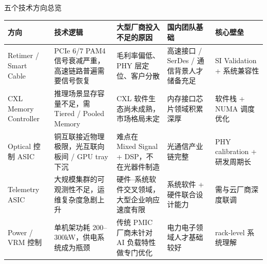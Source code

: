\documentclass[aspectratio=169, 8pt, UTF8]{ctexbeamer}
\begin{document}
\begin{frame}{五个技术方向总览}
  \centering
  \footnotesize
  \begin{tabularx}{\textwidth}{p{2.2cm} p{2.9cm} p{2.4cm} p{2.6cm} p{2.8cm}}
    \toprule
    \textbf{方向} & \textbf{技术逻辑} & \textbf{大型厂商投入不足的原因} & \textbf{国内团队基础} & \textbf{核心壁垒} \\
    \midrule
    Retimer / Smart Cable
      & PCIe 6/7 PAM4 信号衰减严重，高速链路普遍需要信号恢复
      & 毛利率偏低、PHY 层定位、客户分散
      & 高速接口 / SerDes / 通信背景人才储备充足
      & SI Validation + 系统兼容性 \\
    \addlinespace
    CXL Memory Controller
      & 推理场景显存容量不足，需 Tiered / Pooled Memory
      & CXL 软件生态尚未成熟，市场格局未定
      & 内存接口芯片领域积累深厚
      & 软件栈 + NUMA 调度优化 \\
    \addlinespace
    Optical 控制 ASIC
      & 铜互联接近物理极限，光互联向板间 / GPU tray 下沉
      & 难点在 Mixed Signal + DSP，不在光器件制造
      & 光通信产业链完整
      & PHY calibration + 研发周期长 \\
    \addlinespace
    Telemetry ASIC
      & 大规模集群的可观测性不足，运维复杂度急剧上升
      & 硬件--系统软件交叉领域，大型企业响应速度有限
      & 系统软件 + 硬件联合设计能力
      & 需与云厂商深度联调 \\
    \addlinespace
    Power / VRM 控制
      & 单机架功耗 200--300kW，供电系统成为瓶颈
      & 传统 PMIC 厂商未针对 AI 负载特性做专门优化
      & 电力电子领域人才基础较好
      & rack-level 系统理解 \\
    \bottomrule
  \end{tabularx}
\end{frame}
\end{document}
